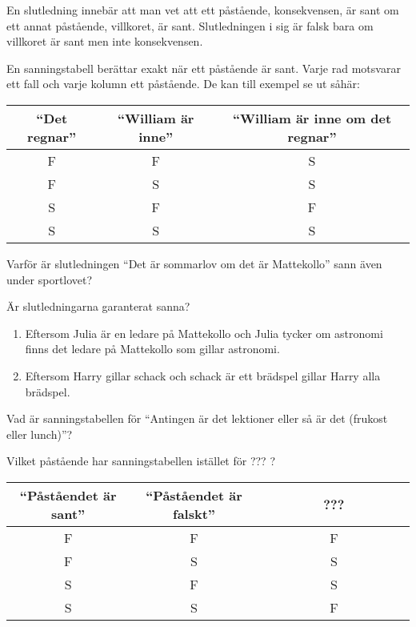 \begin{definition}[Slutledning]
	En slutledning innebär att man vet att ett påstående, konsekvensen, är sant om ett annat påstående, villkoret, är sant. Slutledningen i sig är falsk bara om villkoret är sant men inte konsekvensen.
\end{definition}

\begin{definition}[Sanningstabell] %
	En sanningstabell berättar exakt när ett påstående är sant. Varje rad motsvarar ett fall och varje kolumn ett påstående. De kan till exempel se ut såhär:
	\begin{center}
		\begin{tabular}{|c|c|c|}
			\hline
			``Det regnar'' & ``William är inne'' & ``William är inne om det regnar'' \\ \hline
			F & F & S \\ \hline
			F & S & S \\ \hline
			S & F & F \\ \hline
			S & S & S \\ \hline
		\end{tabular}
	\end{center}
\end{definition}

\begin{problem}
	Varför är slutledningen ``Det är sommarlov om det är Mattekollo'' sann även under sportlovet?
\end{problem}

\begin{problem}
	Är slutledningarna garanterat sanna?
	\begin{enumerate}[label=\alph*)]
		\item Eftersom Julia är en ledare på Mattekollo och Julia tycker om astronomi finns det ledare på Mattekollo som gillar astronomi.
		\item Eftersom Harry gillar schack och schack är ett brädspel gillar Harry alla brädspel.
	\end{enumerate}
\end{problem}

\begin{problem}
	Vad är sanningstabellen för ``Antingen är det lektioner eller så är det (frukost eller lunch)''?
\end{problem}

\begin{problem}
	Vilket påstående har sanningstabellen istället för ??? ?
	\begin{center}
		\begin{tabular}{|c|c|c|}
			\hline
			``Påståendet är sant'' & ``Påståendet är falskt'' & ~~~~~~~~???~~~~~~~~ \\ \hline
			F & F & F \\ \hline
			F & S & S \\ \hline
			S & F & S \\ \hline
			S & S & F \\ \hline
		\end{tabular}
	\end{center}
\end{problem}

